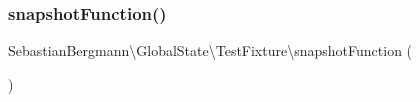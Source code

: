 \subsubsection{\texorpdfstring{snapshot\+Function()}{snapshotFunction()}}
{\footnotesize\ttfamily Sebastian\+Bergmann\textbackslash{}\+Global\+State\textbackslash{}\+Test\+Fixture\textbackslash{}snapshot\+Function (\begin{DoxyParamCaption}{ }\end{DoxyParamCaption})}

